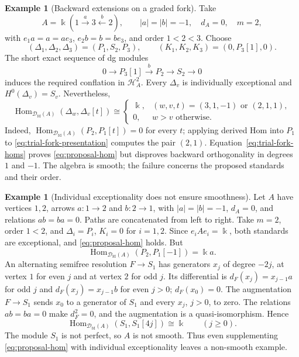 \documentclass[11pt,a4paper]{article}
\newcommand{\D}{\mathcal D}
\renewcommand{\H}{\mathcal H}
\newcommand{\std}{\Delta}
\DeclareMathOperator{\fd}{fd}
\DeclareMathOperator{\Hom}{Hom}
\theoremstyle{plain}
\theoremstyle{definition}
\newtheorem{example}[theorem]{Example}
\numberwithin{equation}{section}
\begin{document}
\begin{example}[Backward extensions on a graded fork]
\label{ex:trial-fork}
Take
\[
 A=\Bbbk(1\xrightarrow{a}3\xleftarrow{b}2),\qquad
 |a|=|b|=-1,\quad d_A=0,\quad m=2,
\]
with $e_1a=a=ae_3$, $e_2b=b=be_3$, and order $1<2<3$.
Choose
\begin{equation}\label{eq:trial-fork-standards}
 (\std_1,\std_2,\std_3)=(P_1,S_2,P_3),\qquad
 (K_1,K_2,K_3)=(0,P_3[1],0).
\end{equation}
The short exact sequence of dg modules
\begin{equation}\label{eq:trial-fork-presentation}
 0\longrightarrow P_3[1]\xrightarrow{b}P_2
 \longrightarrow S_2\longrightarrow0
\end{equation}
induces the required conflation in $\H_A^2$.
Every $\std_v$ is individually exceptional and
$H^0(\std_v)=S_v$. Nevertheless,
\begin{equation}\label{eq:trial-fork-homs}
 \Hom_{\D_{\fd}(A)}(\std_w,\std_v[t])\cong
 \begin{cases}
 \Bbbk,&(w,v,t)=(3,1,-1)\text{ or }(2,1,1),\\
 0,&w>v\text{ otherwise}.
 \end{cases}
\end{equation}
Indeed, $\Hom_{\D_{\fd}(A)}(P_2,P_1[t])=0$ for every $t$;
applying derived Hom into $P_1$ to
\eqref{eq:trial-fork-presentation} computes the pair $(2,1)$.
Equation~\eqref{eq:trial-fork-homs} proves
\eqref{eq:proposal-hom} but disproves backward orthogonality in
degrees $1$ and $-1$. The algebra is smooth; the failure concerns
the proposed standards and their order.
\end{example}

\begin{example}[Individual exceptionality does not ensure smoothness]
\label{ex:trial-cycle}
Let $A$ have vertices $1,2$, arrows $a:1\to2$ and $b:2\to1$,
with $|a|=|b|=-1$, $d_A=0$, and relations $ab=ba=0$.
Paths are concatenated from left to right. Take $m=2$, order $1<2$,
and $\std_i=P_i$, $K_i=0$ for $i=1,2$.
Since $e_iAe_i=\Bbbk$, both standards are exceptional, and
\eqref{eq:proposal-hom} holds. But
\[
 \Hom_{\D_{\fd}(A)}(P_2,P_1[-1])=\Bbbk a.
\]
An alternating semifree resolution $F\to S_1$ has generators $x_j$
of degree $-2j$, at vertex $1$ for even $j$ and at vertex $2$ for
odd $j$. Its differential is
$d_F(x_j)=x_{j-1}a$ for odd $j$ and
$d_F(x_j)=x_{j-1}b$ for even $j>0$; $d_F(x_0)=0$.
The augmentation $F\to S_1$ sends $x_0$ to a generator of $S_1$
and every $x_j$, $j>0$, to zero.
The relations $ab=ba=0$ make $d_F^2=0$, and the augmentation is a
quasi-isomorphism. Hence
\begin{equation}\label{eq:trial-cycle-ext}
 \Hom_{\D_{\fd}(A)}(S_1,S_1[4j])\cong\Bbbk
 \qquad(j\geq0).
\end{equation}
The module $S_1$ is not perfect, so $A$ is not smooth.
Thus even supplementing \eqref{eq:proposal-hom} with individual
exceptionality leaves a non-smooth example.
\end{example}
\end{document}
